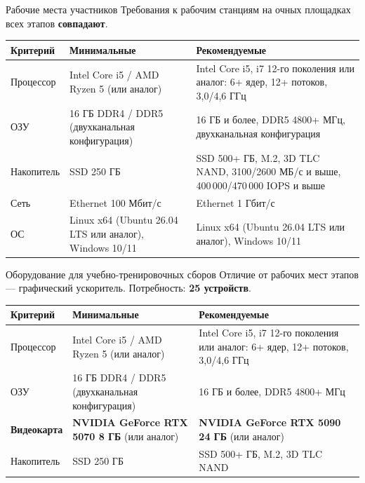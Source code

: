 
\begin{frame}{Рабочие места участников\orient}
  \vspace{0.1em}
  {\footnotesize\color{acGray}Требования к рабочим станциям на очных площадках
  всех этапов \textbf{совпадают}.}
  \vspace{0.6em}

  \small
  \begin{tabular}{@{}p{}p{}p{}@{}}
    \toprule
    \textbf{Критерий} & \textbf{Минимальные} & \textbf{Рекомендуемые}\\
    \midrule
    Процессор & Intel Core i5 / AMD Ryzen 5 (или аналог) &
      Intel Core i5, i7 12-го поколения или аналог: 6+ ядер, 12+ потоков, 3{,}0/4{,}6 ГГц\\
    \addlinespace[0.25em]
    ОЗУ & 16 ГБ DDR4 / DDR5 (двухканальная конфигурация) &
      16 ГБ и более, DDR5 4800+ МГц, двухканальная конфигурация\\
    \addlinespace[0.25em]
    Накопитель & SSD 250 ГБ &
      SSD 500+ ГБ, M.2, 3D TLC NAND, 3100/2600 МБ/с и выше, 400\,000/470\,000 IOPS и выше\\
    \addlinespace[0.25em]
    Сеть & Ethernet 100 Мбит/с & Ethernet 1 Гбит/с\\
    \addlinespace[0.25em]
    ОС & Linux x64 (Ubuntu 26.04 LTS или аналог), Windows 10/11 &
      Linux x64 (Ubuntu 26.04 LTS или аналог), Windows 10/11\\
    \bottomrule
  \end{tabular}
\end{frame}

\begin{frame}{Оборудование для учебно-тренировочных сборов\orient}
  \vspace{0.1em}
  {\footnotesize\color{acGray}Отличие от рабочих мест этапов ---
  графический ускоритель. Потребность: \textbf{25 устройств}.}
  \vspace{0.6em}

  \small
  \begin{tabular}{@{}p{}p{}p{}@{}}
    \toprule
    \textbf{Критерий} & \textbf{Минимальные} & \textbf{Рекомендуемые}\\
    \midrule
    Процессор & Intel Core i5 / AMD Ryzen 5 (или аналог) &
      Intel Core i5, i7 12-го поколения или аналог: 6+ ядер, 12+ потоков, 3{,}0/4{,}6 ГГц\\
    \addlinespace[0.25em]
    ОЗУ & 16 ГБ DDR4 / DDR5 (двухканальная конфигурация) &
      16 ГБ и более, DDR5 4800+ МГц\\
    \addlinespace[0.25em]
    \textbf{Видеокарта} & \textbf{NVIDIA GeForce RTX 5070 8 ГБ} (или аналог) &
      \textbf{NVIDIA GeForce RTX 5090 24 ГБ} (или аналог)\\
    \addlinespace[0.25em]
    Накопитель & SSD 250 ГБ & SSD 500+ ГБ, M.2, 3D TLC NAND\\
    \bottomrule
  \end{tabular}
\end{frame}

